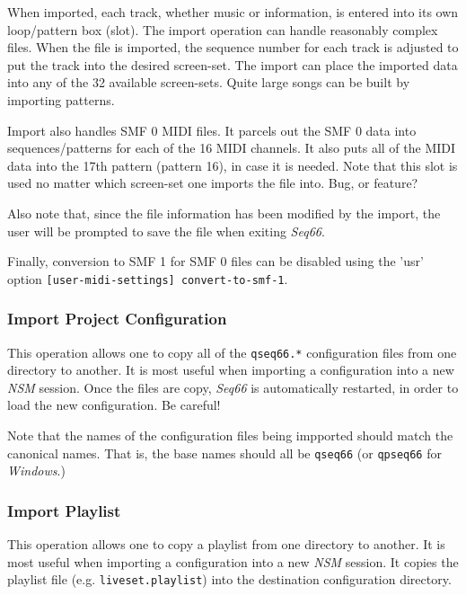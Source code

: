    When imported, each track, whether music or information,
   is entered into its own loop/pattern box (slot).
   The import operation can handle reasonably complex files.
   When the file is imported, the sequence number for each track is
   adjusted to put the track into the desired screen-set.
   The import can place the imported data into any of the 32 available
   screen-sets.  Quite large songs can be built by importing patterns.

   Import also handles SMF 0 MIDI files.  It parcels out the SMF 0 data
   into sequences/patterns for each of the 16 MIDI channels.  It also puts
   all of the MIDI data into the 17th pattern (pattern 16), in case it is
   needed.  Note that this slot is used no matter which screen-set one imports
   the file into.  Bug, or feature?

   Also note that, since the file information has been modified by the import,
   the user will be prompted to save the file when exiting \textsl{Seq66}.

   Finally, conversion to SMF 1 for SMF 0 files can be disabled using the
   'usr' option \texttt{[user-midi-settings] convert-to-smf-1}.

\subsubsection{Import Project Configuration}
\label{subsubsec:midi_export_file_import_project}

   This operation allows one to copy all of the \texttt{qseq66.*} configuration
   files from one directory to another.  It is most useful when
   importing a configuration into a new \textsl{NSM} session.
   Once the files are copy, \textsl{Seq66} is automatically restarted,
   in order to load the new configuration.  Be careful!

   Note that the names of the configuration files being impported should
   match the canonical names.  That is, the base names should all be
   \texttt{qseq66} (or \texttt{qpseq66} for \textsl{Windows}.)

\subsubsection{Import Playlist}
\label{subsubsec:midi_export_file_import_playlist}

   This operation allows one to copy a playlist
   from one directory to another.  It is most useful when
   importing a configuration into a new \textsl{NSM} session.
   It copies the playlist file (e.g. \texttt{liveset.playlist})
   into the destination configuration directory.

